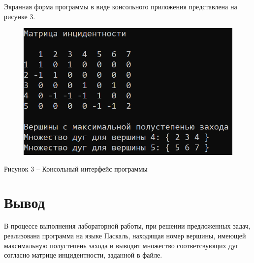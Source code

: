 \documentclass[a4paper,14pt]{extarticle}
\begin{document}
  Экранная форма программы в виде консольного приложения представлена на рисунке 3.

  \begin{figure}[h]
    \centering
    \includegraphics[width=0.6\linewidth]{images/image.png}
  \end{figure}
  \begin{center}
    Рисунок 3 – Консольный интерфейс программы
  \end{center}

  \section*{\hspace{12.5mm}Вывод}
  В процессе выполнения лабораторной работы, при решении предложенных задач, реализована программа на языке Паскаль, находящая номер вершины, имеющей максимальную полустепень захода и выводит множество соответсвующих дуг согласно матрице инцидентности, заданной в файле.
\end{document}
